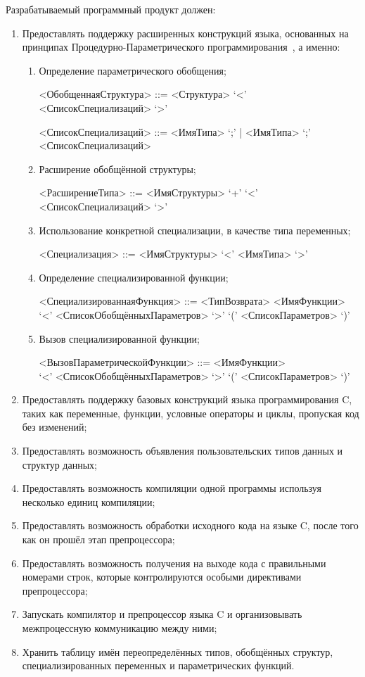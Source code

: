 Разрабатываемый программный продукт должен:

\begin{enumerate}
  \item Предоставлять поддержку расширенных конструкций языка, основанных на принципах Процедурно-Параметрического программирования~\cite{легалов2016эволюционное}, а именно:
  \begin{enumerate}
    \item Определение параметрического обобщения;
    \begin{grammar}
      <ОбобщеннаяСтруктура> ::= <Структура> `<' <СписокСпециализаций> `>'

      <СписокСпециализаций> ::= <ИмяТипа> `;' | <ИмяТипа> `;' <СписокСпециализаций>
    \end{grammar}
    \item Расширение обобщённой структуры;
    \begin{grammar}
      <РасширениеТипа> ::= <ИмяСтруктуры> `+' `<' <СписокСпециализаций> `>'
    \end{grammar}
    \item Использование конкретной специализации, в качестве типа переменных;
    \begin{grammar}
      <Специализация> ::= <ИмяСтруктуры> `<' <ИмяТипа> `>'
    \end{grammar}
    \item Определение специализированной функции;
    \begin{grammar}
      <СпециализированнаяФункция> ::= <ТипВозврата> <ИмяФункции> \\ `<' <СписокОбобщённыхПараметров> `>' `(' <СписокПараметров> `)'
    \end{grammar}
    \item Вызов специализированной функции;
    \begin{grammar}
      <ВызовПараметрическойФункции> ::= <ИмяФункции> \\ `<' <СписокОбобщённыхПараметров> `>' `(' <СписокПараметров> `)'
    \end{grammar}
  \end{enumerate}

  \item Предоставлять поддержку базовых конструкций языка программирования C, таких как переменные, функции, условные операторы и циклы, пропуская код без изменений;
  \item Предоставлять возможность объявления пользовательских типов данных и структур данных;
  \item Предоставлять возможность компиляции одной программы используя несколько единиц компиляции;
  \item Предоставлять возможность обработки исходного кода на языке C, после того как он прошёл этап препроцессора;
  \item Предоставлять возможность получения на выходе кода с правильными номерами строк, которые контролируются особыми директивами препроцессора;

  \item Запускать компилятор и препроцессор языка C и организовывать межпроцессную коммуникацию между ними;
  \item Хранить таблицу имён переопределённых типов, обобщённых структур, специализированных переменных и параметрических функций.
\end{enumerate}

